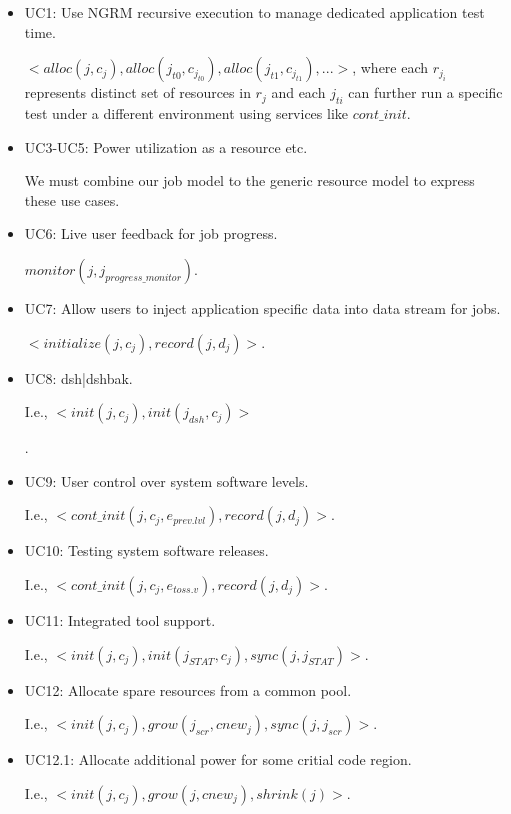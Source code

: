 \begin{itemize}

\item{UC1: Use NGRM recursive execution to manage dedicated application test time.

$<alloc(j, c_j), alloc(j_{t0}, c_{j_{t0}}), alloc(j_{t1}, c_{j_{t1}}), ...>$, where each $r_{j_i}$ represents distinct set of resources in $r_{j}$ and each $j_{ti}$ can further run a specific test under a different environment using services like $cont\_init$.}

\item{UC3-UC5: Power utilization as a resource etc.

We must combine our job model to the generic resource model to express these use cases.}

\item{UC6: Live user feedback for job progress.

$monitor(j, j_{progress\_monitor})$.}

\item{UC7: Allow users to inject application specific data into data stream for jobs.

$<initialize(j, c_j), record(j, d_j)>$.}

\item{UC8: dsh|dshbak.

I.e., $<init(j, c_j), init(j_{dsh}, c_j)>$}.

\item{UC9: User control over system software levels.

I.e., $<cont\_init(j, c_j, e_{prev.lvl}), record(j, d_j)>$.}

\item{UC10: Testing system software releases.

I.e., $<cont\_init(j, c_j,e_{toss.v}), record(j, d_j)>$.}

\item{UC11: Integrated tool support.

I.e., $<init(j, c_j), init(j_{STAT}, c_j), sync(j, j_{STAT})>$.}

\item{UC12: Allocate spare resources from a common pool.

I.e., $<init(j, c_j), grow(j_{scr}, cnew_j), sync(j, j_{scr})>$.}

\item{UC12.1: Allocate additional power for some critial code region.

I.e., $<init(j, c_j), grow(j, cnew_j), shrink(j)>$.}


\end{itemize}

